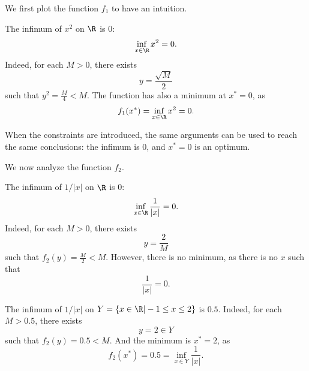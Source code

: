 
We first plot the function $f_1$ to have an intuition. 

\begin{center}
\end{center}

The infimum of  $x^2$ on $\R$ is 0:
\[
\inf_{x \in \R} x^2 = 0.
\]
Indeed, for each $M > 0$, there exists 
\[
y = \frac{\sqrt{M}}{2}
\]
such that $y^2 = \frac{M}{4} < M$.
The function has also a minimum at $x^*=0$, as
\[
f_1(x^*) = \inf_{x \in \R} x^2 = 0.
\]

When the constraints are introduced, the same arguments can be used to
reach the same conclusions: the infimum is 0, and $x^*=0$ is an optimum.




We now analyze the function $f_2$.


\begin{center}
\end{center}


The infimum of $1/|x|$ on $\R$ is $0$:
\[
\inf_{x \in \R} \frac{1}{|x|} = 0.
\]
Indeed, for each $M>0$, there exists 
\[
y = \frac{2}{M}
\]
such that $f_2(y) = \frac{M}{2} < M$.
However, there is no minimum, as there is no $x$ such that
\[
\frac{1}{|x|} = 0.
\]

The infimum of $1/|x|$ on $Y=\{x \in \R|-1\leq x \leq 2\}$ is $0.5$.
Indeed, for each $M>0.5$, there exists 
\[
y = 2 \in Y
\]
such that $f_2(y) = 0.5 < M$.
And the minimum is $x^*=2$, as
\[
f_2(x^*)=0.5 = \inf_{x \in Y} \frac{1}{|x|}.
\]


